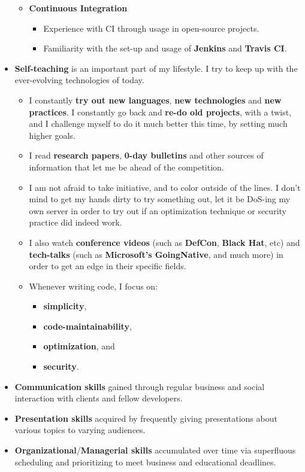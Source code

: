 \documentclass[11pt,a4paper]{article}
\begin{document}
\begin{itemize}
\begin{itemize}
\begin{itemize}
			\end{itemize}
		\item	\textbf{Continuous Integration}
			\begin{itemize}
				\item	Experience with CI through usage in open-source projects.
				\item	Familiarity with the set-up and usage of \textbf{Jenkins} and \textbf{Travis CI}.
			\end{itemize}
		\end{itemize}
	\item	\textbf{Self-teaching} is an important part of my lifestyle. I try to keep up with the ever-evolving technologies of today.
		\begin{itemize}
		\item	I constantly \textbf{try out new languages}, \textbf{new technologies} and \textbf{new practices}. I constantly go back and \textbf{re-do old projects}, with a twist, and I challenge myself to do it much better this time, by setting much higher goals.
		\item	I read \textbf{research papers}, \textbf{0-day bulletins} and other sources of information that let me be ahead of the competition.
		\item	I am not afraid to take initiative, and to color outside of the lines. I don't mind to get my hands dirty to try something out, let it be DoS-ing my own server in order to try out if an optimization technique or security practice did indeed work.
		\item	I also watch \textbf{conference videos} (such as \textbf{DefCon}, \textbf{Black Hat}, etc) and \textbf{tech-talks} (such as \textbf{Microsoft's GoingNative}, and much more) in order to get an edge in their specific fields.
		\item	Whenever writing code, I focus on:
			\begin{itemize}
			\item	\textbf{simplicity},
			\item	\textbf{code-maintainability},
			\item	\textbf{optimization}, and
			\item	\textbf{security}.
			\end{itemize}
		\end{itemize}
	\item	\textbf{Communication skills} gained through regular business and social interaction with clients and fellow developers.
	\item	\textbf{Presentation skills} acquired by frequently giving presentations about various topics to varying audiences.
	\item	\textbf{Organizational}/\textbf{Managerial skills} accumulated over time via superfluous scheduling and prioritizing to meet business and educational deadlines.
	\end{itemize}
\end{document}
